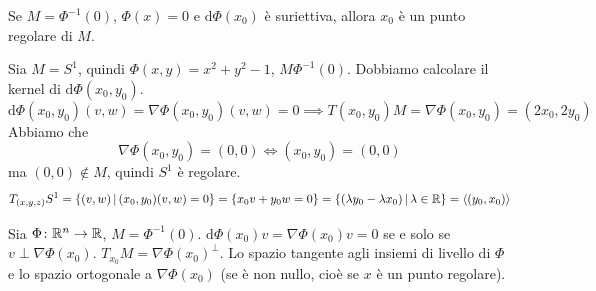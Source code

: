 \documentclass[a4paper]{article}
\begin{document}
\begin{snippetdefinition}{}
    Se \(M = \Phi^{-1}(0)\), \(\Phi(x) = 0\) e \(\text{d}\Phi(x_0)\) è suriettiva, allora
    \(x_0\) è un punto regolare di \(M\).
\end{snippetdefinition}

\begin{snippetexample}{}
    Sia \(M=S^1\), quindi \(\Phi(x,y) = x^2 + y^2 - 1\),
    \(M\Phi^{-1}(0)\). Dobbiamo calcolare il kernel di \(\text{d} \Phi(x_0, y_0)\).
    \[
        \text{d}\Phi(x_0, y_0)(v,w) = \nabla \Phi(x_0, y_0)(v,w) =0
        \implies
        T(x_0, y_0)M = \nabla \Phi(x_0, y_0) = (2x_0, 2y_0)
    \]
    Abbiamo che
    \[
        \nabla \Phi(x_0, y_0) = (0,0) \iff (x_0, y_0) = (0,0)
    \]
    ma \((0,0) \notin M\), quindi \(S^1\) è regolare.
    \[
        T_{(x,y,z)}S^1 = \{(v,w) \,|\, (x_0, y_0)(v,w) = 0\}
        = \{
            x_0v +y_0w = 0
        \} = \{(\lambda y_0 - \lambda x_0) \,|\, \lambda \in \mathbb{R}\}
        = \langle(y_0, x_0)\rangle
    \]
\end{snippetexample}

\begin{snippetexample}{}
    Sia \(\Phi \colon \mathbb{R}^n \to \mathbb{R}\), \(M = \Phi^{-1}(0)\).
    \(\text{d}\Phi(x_0)v = \nabla \Phi(x_0)v = 0\)
    se e solo se \(v \perp \nabla \Phi(x_0)\).
    \(T_{x_0}M = \nabla \Phi(x_0)^\perp\).
    Lo spazio tangente agli insiemi di livello di \(\Phi\) e lo spazio ortogonale a \(\nabla \Phi(x_0)\)
    (se è non nullo, cioè se \(x\) è un punto regolare).
\end{snippetexample}
\end{document}
